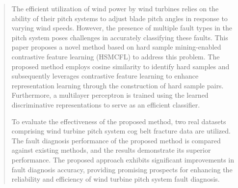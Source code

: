\documentclass[lettersize,journal]{IEEEtran}
\begin{document}


\maketitle

\begin{abstract}
The efficient utilization of wind power by wind turbines relies on the ability of their pitch systems to adjust blade pitch angles in response to varying wind speeds. However, the presence of multiple fault types in the pitch system poses challenges in accurately classifying these faults. This paper proposes a novel method based on hard sample mining-enabled contrastive feature learning (HSMCFL) to address this problem. The proposed method employs cosine similarity to identify hard samples and subsequently leverages contrastive feature learning to enhance representation learning through the construction of hard sample pairs. Furthermore, a multilayer perceptron is trained using the learned discriminative representations to serve as an efficient classifier.

To evaluate the effectiveness of the proposed method, two real datasets comprising wind turbine pitch system cog belt fracture data are utilized. The fault diagnosis performance of the proposed method is compared against existing methods, and the results demonstrate its superior performance. The proposed approach exhibits significant improvements in fault diagnosis accuracy, providing promising prospects for enhancing the reliability and efficiency of wind turbine pitch system fault diagnosis.

\end{abstract}
\end{document}
